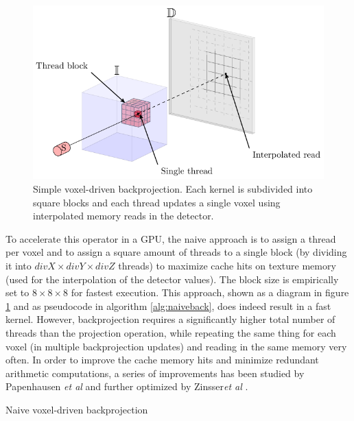 \begin{figure}
\begin{center}

\includegraphics{GPUmethods/simplebackproj-figure0.pdf} 
\end{center}

\caption[Diagram of the voxel driven backproejction]{\label{fig:simpleback} Simple voxel-driven backprojection. Each kernel is subdivided into square blocks and each thread updates a single voxel using interpolated memory reads in the detector.} 
\end{figure}


To accelerate this operator in a GPU, the naive approach is to assign a thread per voxel and to assign a square amount of threads to a single block (by dividing it into $divX\times divY\times divZ$ threads) to maximize cache hits on texture memory (used for the interpolation of the detector values). The block size is empirically set to $8\times 8\times 8$ for fastest execution. This approach, shown as a diagram in figure \ref{fig:simpleback} and as pseudocode in algorithm \ref{alg:naiveback}, does indeed result in a fast kernel. However, backprojection requires a significantly higher total number of threads than the projection operation, while repeating the same thing for each voxel (in multiple backprojection updates) and reading in the same memory very often. In order to improve the cache memory hits and minimize redundant arithmetic computations, a series of improvements has been studied by Papenhausen \emph{et al}\cite{papenhausen2011gpu} and further optimized by Zinsser\emph{et al} \cite{zinsser2013systematic}.

\begin{algorithm}

\caption{Naive voxel-driven backprojection
\label{alg:naiveback}}
\begin{algorithmic}[1]


\Ensure{} 
\EndFor

\end{algorithmic}

\end{algorithm}


